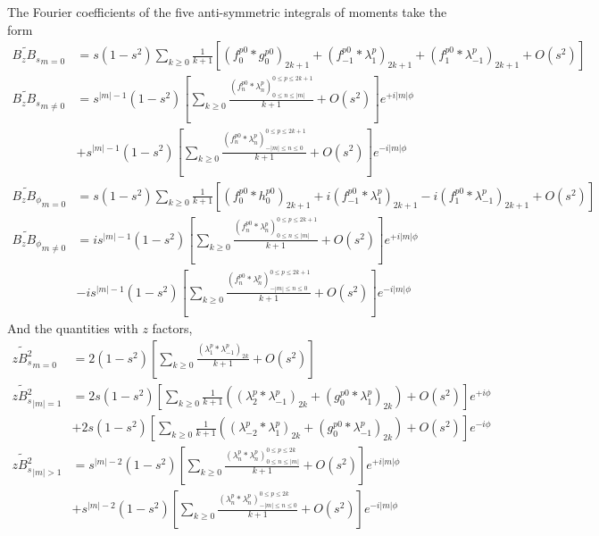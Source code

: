 The Fourier coefficients of the five anti-symmetric integrals of moments take the form
\begin{equation}
\begin{aligned}
    \widetilde{B_z B_s}_{m=0} &= s \left(1 - s^2\right) \sum_{k\geq 0}\frac{1}{k+1}\left[(f_0^{p0}*g_0^{p0})_{2k+1} + (f_{-1}^{p0} * \lambda_{1}^p)_{2k+1} + (f_{1}^{p0} * \lambda_{-1}^p)_{2k+1} + O\left(s^2\right)\right] \\ 
    \widetilde{B_z B_s}_{m\neq 0} &= s^{|m|-1} \left(1 - s^2\right) \left[\sum_{k\geq 0} \frac{(f_n^{p0} * \lambda_n^p)_{0\leq n \leq |m|}^{0\leq p \leq 2k+1}}{k+1} + O\left(s^2\right)\right] e^{+i|m|\phi} \\ 
    &+ s^{|m|-1} \left(1 - s^2\right) \left[\sum_{k\geq 0} \frac{(f_n^{p0} * \lambda_n^p)_{-|m| \leq n \leq 0}^{0\leq p \leq 2k+1}}{k+1} + O\left(s^2\right)\right] e^{-i|m|\phi} \\ 
    \widetilde{B_z B_\phi}_{m=0} &= s \left(1 - s^2\right) \sum_{k\geq 0}\frac{1}{k+1}\left[(f_0^{p0}*h_0^{p0})_{2k+1} + i(f_{-1}^{p0} * \lambda_{1}^p)_{2k+1} - i(f_{1}^{p0} * \lambda_{-1}^p)_{2k+1} + O\left(s^2\right)\right] \\ 
    \widetilde{B_z B_\phi}_{m\neq 0} &= i s^{|m|-1} \left(1 - s^2\right) \left[\sum_{k\geq 0} \frac{(f_n^{p0} * \lambda_n^p)_{0\leq n \leq |m|}^{0\leq p \leq 2k+1}}{k+1} + O\left(s^2\right)\right] e^{+i|m|\phi} \\ 
    &-i s^{|m|-1} \left(1 - s^2\right) \left[\sum_{k\geq 0} \frac{(f_n^{p0} * \lambda_n^p)_{-|m| \leq n \leq 0}^{0\leq p \leq 2k+1}}{k+1} + O\left(s^2\right)\right] e^{-i|m|\phi}
\end{aligned}
\end{equation}
And the quantities with $z$ factors,
\begin{equation}
    \begin{aligned}
        \widetilde{zB_s^2}_{m=0} &= 2\left(1 - s^2\right) \left[\sum_{k\geq 0} \frac{(\lambda_1^p * \lambda_{-1}^p)_{2k}}{k+1} + O\left(s^2\right)\right] \\ 
        \widetilde{zB_s^2}_{|m|=1} &= 2 s \left(1 - s^2\right) \left[\sum_{k\geq 0} \frac{1}{k+1} \left((\lambda_2^p * \lambda_{-1}^p)_{2k} + (g_0^{p0} * \lambda_{1}^p)_{2k}\right) + O\left(s^2\right)\right] e^{+i\phi} \\ 
        &+ 2 s \left(1 - s^2\right) \left[\sum_{k\geq 0} \frac{1}{k+1} \left((\lambda_{-2}^p * \lambda_{1}^p)_{2k} + (g_0^{p0} * \lambda_{-1}^p)_{2k}\right) + O\left(s^2\right)\right] e^{-i\phi} \\
        \widetilde{zB_s^2}_{|m|>1} &= s^{|m|-2} \left(1 - s^2\right) \left[\sum_{k\geq 0} \frac{(\lambda_n^p * \lambda_{n}^p)_{0\leq n \leq |m|}^{0\leq p \leq 2k}}{k+1} + O\left(s^2\right)\right] e^{+i|m|\phi} \\ 
        &+ s^{|m|-2} \left(1 - s^2\right) \left[\sum_{k\geq 0} \frac{(\lambda_n^p * \lambda_{n}^p)_{-|m|\leq n \leq 0}^{0\leq p \leq 2k}}{k+1} + O\left(s^2\right)\right] e^{-i|m|\phi}
    \end{aligned}
\end{equation}
